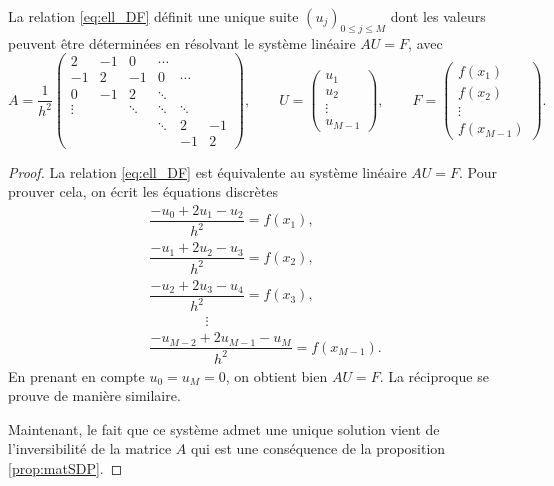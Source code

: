 \documentclass[12pt,a4paper,twoside]{article}
\begin{document}
\begin{proposition}
  La relation \eqref{eq:ell_DF} d\'efinit une unique suite $(u_j)_{0\leq j \leq M}$ dont les valeurs
  peuvent \^etre d\'etermin\'ees en r\'esolvant le syst\`eme lin\'eaire
  $A U = F$, avec 
  \begin{equation}
    \label{eq:mat_DF_Laplacien}
    A = \dfrac{1}{h^2} 
    \begin{pmatrix} 
      2 & -1 & 0 & \cdots
      \\
      -1 & 2 & -1 & 0 & \cdots
      \\
      0 & -1 & 2 & \ddots &
      \\
      \vdots & & \ddots & \ddots & \ddots
      \\
      & & &  \ddots & 2 & -1
      \\
      & &  & & -1 & 2
    \end{pmatrix} , \qquad U = 
    \begin{pmatrix}
      u_1 \\ u_2 \\ \vdots \\ u_{M-1}
    \end{pmatrix} , \qquad F = 
    \begin{pmatrix}
      f(x_1) \\ f(x_2) \\ \vdots \\ f(x_{M-1})
    \end{pmatrix} .
  \end{equation}
\end{proposition}

\begin{proof}
  La relation \eqref{eq:ell_DF} est \'equivalente au syst\`eme lin\'eaire $AU = F$.
  Pour prouver cela, on \'ecrit les \'equations discr\`etes
  \begin{align*}
    &\dfrac{-u_0 + 2 u_1 - u_2}{h^2} = f(x_1) ,
    \\
    &\dfrac{-u_1 + 2 u_2 - u_3}{h^2} = f(x_2) ,
    \\
    &\dfrac{-u_2 + 2 u_3 - u_4}{h^2} = f(x_3) ,
    \\
    & \qquad \qquad \vdots
    \\
    &\dfrac{-u_{M-2} + 2 u_{M-1} - u_M}{h^2} = f(x_{M-1}) .
  \end{align*}
  En prenant en compte $u_0 = u_M = 0$, on obtient bien $AU = F$.
  La r\'eciproque se prouve de mani\`ere similaire.

  Maintenant, le fait que ce syst\`eme admet une unique solution vient de l'inversibilit\'e
  de la matrice $A$ qui est une cons\'equence de la proposition \ref{prop:matSDP}.
\end{proof}
\end{document}
